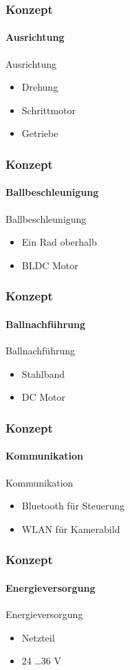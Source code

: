 \begin{frame}
    \frametitle{Konzept}
    \framesubtitle{Ausrichtung}
    \begin{block}{Ausrichtung}
        \begin{itemize}
            \item Drehung
            \item Schrittmotor
            \item Getriebe
        \end{itemize}
    \end{block}
\end{frame}

\begin{frame}
    \frametitle{Konzept}
    \framesubtitle{Ballbeschleunigung}
    \begin{block}{Ballbeschleunigung}
        \begin{itemize}
            \item Ein Rad oberhalb
            \item BLDC Motor
        \end{itemize}
    \end{block}
\end{frame}

\begin{frame}
    \frametitle{Konzept}
    \framesubtitle{Ballnachführung}
    \begin{block}{Ballnachführung}
        \begin{itemize}
            \item Stahlband
            \item DC Motor
        \end{itemize}
    \end{block}
\end{frame}

\begin{frame}
    \frametitle{Konzept}
    \framesubtitle{Kommunikation}
    \begin{block}{Kommunikation}
        \begin{itemize}
            \item Bluetooth für Steuerung
            \item WLAN für Kamerabild
        \end{itemize}
    \end{block}
\end{frame}

\begin{frame}
    \frametitle{Konzept}
    \framesubtitle{Energieversorgung}
    \begin{block}{Energieversorgung}
        \begin{itemize}
            \item Netzteil
            \item 24 \ldots 36 V
        \end{itemize}
    \end{block}
\end{frame}

